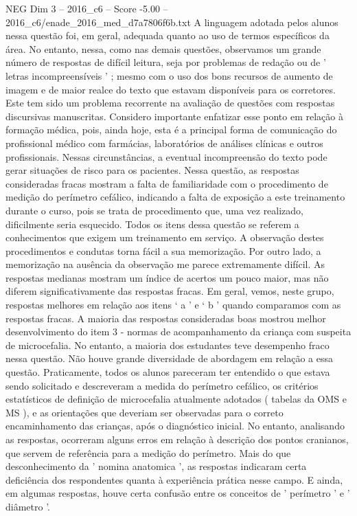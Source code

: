 \begin{textsample}{NEG Dim 3 – 2016\_c6 – Score -5.00 – 2016\_c6/enade\_2016\_med\_d7a7806f6b.txt}
A linguagem adotada pelos alunos nessa questão foi, em geral, adequada quanto ao uso de termos específicos da área.
No entanto, nessa, como nas demais questões, observamos um grande número de respostas de difícil leitura, seja por problemas de redação ou de ' letras incompreensíveis ' ; mesmo com o uso dos bons recursos de aumento de imagem e de maior realce do texto que estavam disponíveis para os corretores.
Este tem sido um problema recorrente na avaliação de questões com respostas discursivas manuscritas.
Considero importante enfatizar esse ponto em relação à formação médica, pois, ainda hoje, esta é a principal forma de comunicação do profissional médico com farmácias, laboratórios de análises clínicas e outros profissionais.
Nessas circunstâncias, a eventual incompreensão do texto pode gerar situações de risco para os pacientes.
Nessa questão, as respostas consideradas fracas mostram a falta de familiaridade com o procedimento de medição do perímetro cefálico, indicando a falta de exposição a este treinamento durante o curso, pois se trata de procedimento que, uma vez realizado, dificilmente seria esquecido.
Todos os itens dessa questão se referem a conhecimentos que exigem um treinamento em serviço.
A observação destes procedimentos e condutas torna fácil a sua memorização.
Por outro lado, a memorização na ausência da observação me parece extremamente difícil.
As respostas medianas mostram um índice de acertos um pouco maior, mas não diferem significativamente das respostas fracas.
Em geral, vemos, neste grupo, respostas melhores em relação aos itens ‘ a ’ e ‘ b ’ quando comparamos com as respostas fracas.
A maioria das respostas consideradas boas mostrou melhor desenvolvimento do item 3 - normas de acompanhamento da criança com suspeita de microcefalia.
No entanto, a maioria dos estudantes teve desempenho fraco nessa questão.
Não houve grande diversidade de abordagem em relação a essa questão.
Praticamente, todos os alunos pareceram ter entendido o que estava sendo solicitado e descreveram a medida do perímetro cefálico, os critérios estatísticos de definição de microcefalia atualmente adotados ( tabelas da OMS e MS ), e as orientações que deveriam ser observadas para o correto encaminhamento das crianças, após o diagnóstico inicial.
No entanto, analisando as respostas, ocorreram alguns erros em relação à descrição dos pontos cranianos, que servem de referência para a medição do perímetro.
Mais do que desconhecimento da ' nomina anatomica ', as respostas indicaram certa deficiência dos respondentes quanta à experiência prática nesse campo.
E ainda, em algumas respostas, houve certa confusão entre os conceitos de ' perímetro ' e ' diâmetro '.

\end{textsample}
